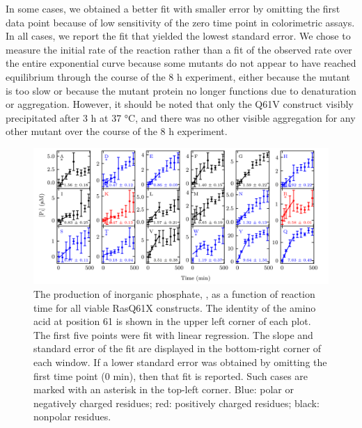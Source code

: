 In some cases, we obtained a better fit with smaller error by omitting the first data point because of low sensitivity of the zero time point in colorimetric assays. 
In all cases, we report the fit that yielded the lowest standard error. 
We chose to measure the initial rate of the reaction rather than a fit of the observed rate over the entire exponential curve because some mutants do not appear to have reached equilibrium through the course of the 8 h experiment, either because the mutant is too slow or because the mutant protein no longer functions due to denaturation or aggregation. 
However, it should be noted that only the Q61V construct visibly precipitated after 3 h at 37 \si{\celsius}, and there was no other visible aggregation for any other mutant over the course of the 8 h experiment.

\begin{figure} 
    \center
    \includegraphics[width=6.0in]{figures-ras/all_fits.png}
    \caption{The production of inorganic phosphate, , as a function of reaction time for all viable RasQ61X constructs. The identity of the amino acid at position 61 is shown in the upper left corner of each plot. The first five points were fit with linear regression. The slope and standard error of the fit are displayed in the bottom-right corner of each window. If a lower standard error was obtained by omitting the first time point (0 min), then that fit is reported. Such cases are marked with an asterisk in the top-left corner. Blue: polar or negatively charged residues; red: positively charged residues; black: nonpolar residues.}
    \label{fig:ras-all_fits}
\end{figure}


